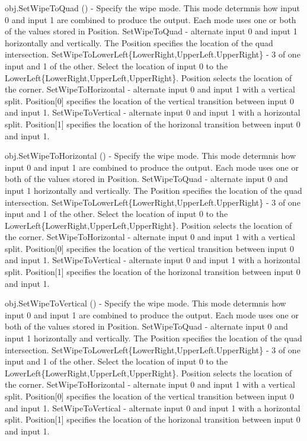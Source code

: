 \begin{DoxyItemize}
\item {\ttfamily obj.\-Set\-Wipe\-To\-Quad ()} -\/ Specify the wipe mode. This mode determnis how input 0 and input 1 are combined to produce the output. Each mode uses one or both of the values stored in Position. Set\-Wipe\-To\-Quad -\/ alternate input 0 and input 1 horizontally and vertically. The Position specifies the location of the quad intersection. Set\-Wipe\-To\-Lower\-Left\{Lower\-Right,Upper\-Left.\-Upper\-Right\} -\/ 3 of one input and 1 of the other. Select the location of input 0 to the Lower\-Left\{Lower\-Right,Upper\-Left,Upper\-Right\}. Position selects the location of the corner. Set\-Wipe\-To\-Horizontal -\/ alternate input 0 and input 1 with a vertical split. Position\mbox{[}0\mbox{]} specifies the location of the vertical transition between input 0 and input 1. Set\-Wipe\-To\-Vertical -\/ alternate input 0 and input 1 with a horizontal split. Position\mbox{[}1\mbox{]} specifies the location of the horizonal transition between input 0 and input 1.  
\item {\ttfamily obj.\-Set\-Wipe\-To\-Horizontal ()} -\/ Specify the wipe mode. This mode determnis how input 0 and input 1 are combined to produce the output. Each mode uses one or both of the values stored in Position. Set\-Wipe\-To\-Quad -\/ alternate input 0 and input 1 horizontally and vertically. The Position specifies the location of the quad intersection. Set\-Wipe\-To\-Lower\-Left\{Lower\-Right,Upper\-Left.\-Upper\-Right\} -\/ 3 of one input and 1 of the other. Select the location of input 0 to the Lower\-Left\{Lower\-Right,Upper\-Left,Upper\-Right\}. Position selects the location of the corner. Set\-Wipe\-To\-Horizontal -\/ alternate input 0 and input 1 with a vertical split. Position\mbox{[}0\mbox{]} specifies the location of the vertical transition between input 0 and input 1. Set\-Wipe\-To\-Vertical -\/ alternate input 0 and input 1 with a horizontal split. Position\mbox{[}1\mbox{]} specifies the location of the horizonal transition between input 0 and input 1.  
\item {\ttfamily obj.\-Set\-Wipe\-To\-Vertical ()} -\/ Specify the wipe mode. This mode determnis how input 0 and input 1 are combined to produce the output. Each mode uses one or both of the values stored in Position. Set\-Wipe\-To\-Quad -\/ alternate input 0 and input 1 horizontally and vertically. The Position specifies the location of the quad intersection. Set\-Wipe\-To\-Lower\-Left\{Lower\-Right,Upper\-Left.\-Upper\-Right\} -\/ 3 of one input and 1 of the other. Select the location of input 0 to the Lower\-Left\{Lower\-Right,Upper\-Left,Upper\-Right\}. Position selects the location of the corner. Set\-Wipe\-To\-Horizontal -\/ alternate input 0 and input 1 with a vertical split. Position\mbox{[}0\mbox{]} specifies the location of the vertical transition between input 0 and input 1. Set\-Wipe\-To\-Vertical -\/ alternate input 0 and input 1 with a horizontal split. Position\mbox{[}1\mbox{]} specifies the location of the horizonal transition between input 0 and input 1.  

\end{DoxyItemize}
